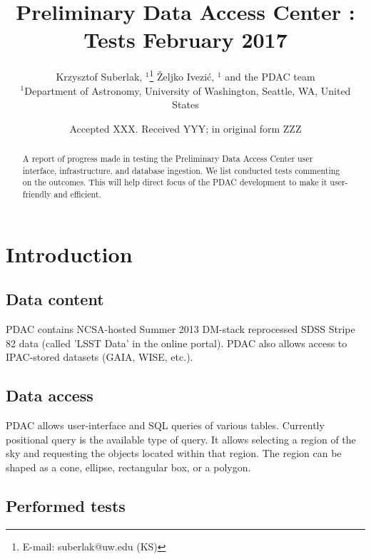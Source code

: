 \documentclass[fleqn,usenatbib, onecolumn]{mnras} %
\title[PDAC progress]{Preliminary Data Access Center : Tests February 2017}
\author[K. Suberlak et al. ]{
Krzysztof Suberlak, $^{1}$\thanks{E-mail: suberlak@uw.edu (KS)}
\v{Z}eljko Ivezi\'c, $^{1}$ and the PDAC team  
\\
$^{1}$Department of Astronomy, University of Washington, Seattle, WA, United States\\
}
\date{Accepted XXX. Received YYY; in original form ZZZ}
\begin{document}
\label{firstpage}
\pagerange{\pageref{firstpage}--\pageref{lastpage}}
\maketitle

\begin{abstract}
A report of progress made in testing the Preliminary Data Access Center user interface, infrastructure, and database ingestion.  We list conducted tests commenting on the outcomes. This will help direct focus of the PDAC development to make it user-friendly and efficient. 
\end{abstract}




\section*{Introduction}
\subsection*{Data content}
PDAC contains NCSA-hosted Summer 2013 DM-stack reprocessed SDSS Stripe 82 data (called 'LSST Data' in the online portal). PDAC also allows access to IPAC-stored datasets (GAIA, WISE, etc.). 

\subsection*{Data access}
PDAC allows user-interface and SQL queries of various tables. Currently positional query is the available type of query. It allows  selecting a region of the sky and requesting the objects located within that region. The region can be shaped as a cone, ellipse, rectangular box, or a polygon.

\subsection*{Performed tests}
\end{document}
